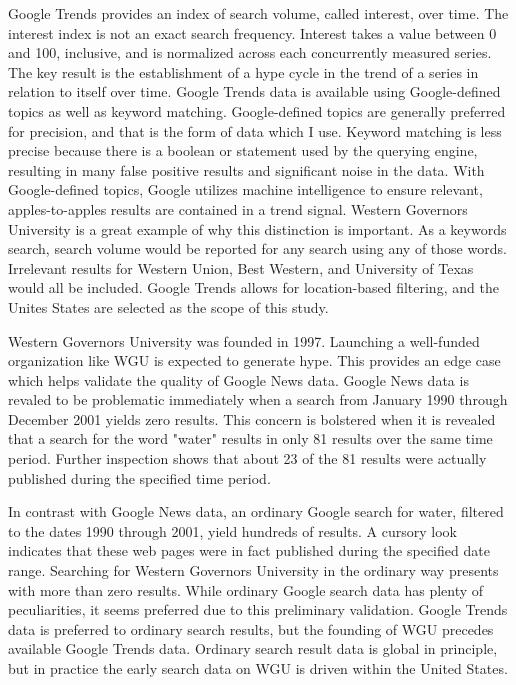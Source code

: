\documentclass[review]{elsarticle}
\begin{document}
Google Trends provides an index of search volume, called interest, over time.
The interest index is not an exact search frequency.
Interest takes a value between 0 and 100, inclusive, and is normalized across each concurrently measured series.
The key result is the establishment of a hype cycle in the trend of a series in relation to itself over time.
Google Trends data is available using Google-defined topics as well as keyword matching.
Google-defined topics are generally preferred for precision, and that is the form of data which I use.
Keyword matching is less precise because there is a boolean or statement used by the querying engine, resulting in many false positive results and significant noise in the data.
With Google-defined topics, Google utilizes machine intelligence to ensure relevant, apples-to-apples results are contained in a trend signal.
Western Governors University is a great example of why this distinction is important.
As a keywords search, search volume would be reported for any search using any of those words.
Irrelevant results for Western Union, Best Western, and University of Texas would all be included.
Google Trends allows for location-based filtering, and the Unites States are selected as the scope of this study.

Western Governors University was founded in 1997.
Launching a well-funded organization like WGU is expected to generate hype.
This provides an edge case which helps validate the quality of Google News data.
Google News data is revaled to be problematic immediately when a search from January 1990 through December 2001 yields zero results.
This concern is bolstered when it is revealed that a search for the word "water" results in only 81 results over the same time period.
Further inspection shows that about 23 of the 81 results were actually published during the specified time period.

In contrast with Google News data, an ordinary Google search for water, filtered to the dates 1990 through 2001, yield hundreds of results.
A cursory look indicates that these web pages were in fact published during the specified date range.
Searching for Western Governors University in the ordinary way presents with more than zero results.
While ordinary Google search data has plenty of peculiarities, it seems preferred due to this preliminary validation.
Google Trends data is preferred to ordinary search results, but the founding of WGU precedes available Google Trends data.
Ordinary search result data is global in principle, but in practice the early search data on WGU is driven within the United States.
\end{document}
